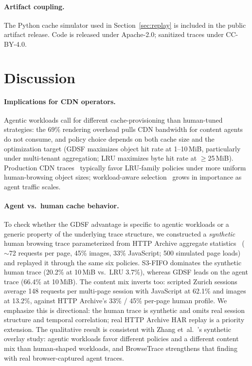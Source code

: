 \documentclass[10pt,sigconf,letterpaper,anonymous,nonacm]{acmart}
\newcommand{\sysname}{Browse\-Trace\xspace}
\begin{document}
\paragraph{Artifact coupling.}
The Python cache simulator used in Section~\ref{sec:replay} is
included in the public artifact release. Code is released under
Apache-2.0; sanitized traces under CC-BY-4.0.

\section{Discussion}
\label{sec:discussion}

\paragraph{Implications for CDN operators.}
Agentic workloads call for different cache-provisioning than
human-tuned strategies: the 69\% rendering overhead pulls CDN
bandwidth for content agents do not consume, and policy choice
depends on both cache size and the optimization target (GDSF
maximizes object hit rate at 1--10\,MiB, particularly under
multi-tenant aggregation; LRU maximizes byte hit rate at
$\geq$25\,MiB).
Production CDN traces~\cite{yang2020learning,berger2017} typically
favor LRU-family policies under more uniform human-browsing object
sizes; workload-aware selection~\cite{zhang2025} grows in importance
as agent traffic scales.

\paragraph{Agent vs.\ human cache behavior.}
To check whether the GDSF advantage is specific to agentic workloads
or a generic property of the underlying trace structure, we constructed
a \emph{synthetic} human browsing trace parameterized from HTTP Archive
aggregate statistics~\cite{httparchive} ($\sim$72 requests per page,
45\% images, 33\% JavaScript; 500 simulated page loads) and replayed
it through the same six policies.  S3-FIFO dominates the synthetic
human trace (20.2\% at 10\,MiB vs.\ LRU 3.7\%), whereas GDSF leads on
the agent trace (66.4\% at 10\,MiB).  The content mix inverts too:
scripted Zurich sessions average 148 requests per multi-page session
with JavaScript at 62.1\% and images at 13.2\%, against HTTP Archive's
33\% / 45\% per-page human profile.  We emphasize this is
directional: the human trace is synthetic and omits real session
structure and temporal correlation; real HTTP Archive HAR replay is a
priority extension.  The qualitative result is consistent with Zhang
et~al.~\cite{zhang2025}'s synthetic overlay study: agentic workloads
favor different policies and a different content mix than human-shaped
workloads, and \sysname strengthens that finding with real
browser-captured agent traces.
\end{document}
